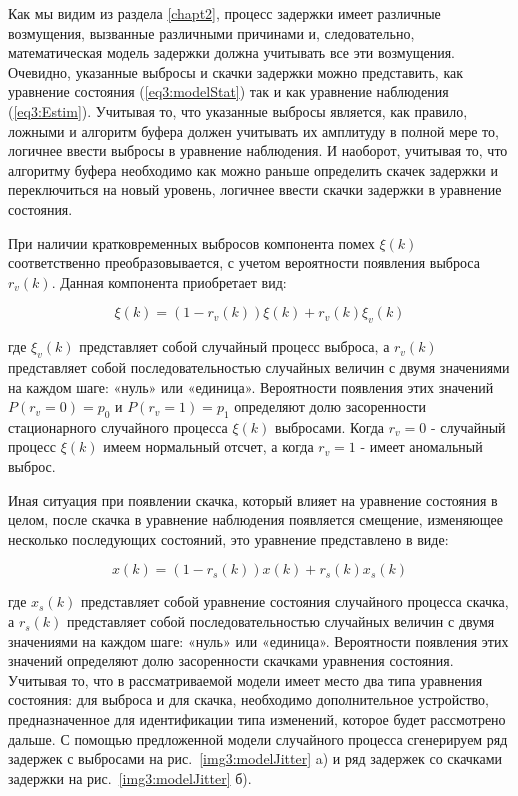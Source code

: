 Как мы видим из раздела \ref{chapt2}, процесс задержки имеет различные возмущения, вызванные различными причинами и, следовательно, математическая модель задержки должна учитывать все эти возмущения.
Очевидно, указанные выбросы и скачки задержки можно представить, как уравнение состояния (\ref{eq3:modelStat}) так и как уравнение наблюдения (\ref{eq3:Estim}). Учитывая то, что указанные выбросы является, как правило, ложными и алгоритм буфера должен учитывать их амплитуду в полной мере то, логичнее ввести выбросы в уравнение наблюдения. И наоборот, учитывая то, что алгоритму буфера необходимо как можно раньше определить скачек задержки и переключиться на новый уровень, логичнее ввести скачки задержки в уравнение состояния.

При наличии кратковременных выбросов компонента помех $\xi(k)$ соответственно преобразовывается, с учетом вероятности появления выброса $r_v(k)$. Данная компонента приобретает вид:

\begin{equation}\label{eq3:v}
\xi(k)=(1-r_v(k))\xi(k)+r_v(k)\xi_v(k)
\end{equation}

\noindent где $\xi_v(k)$ представляет собой случайный процесс выброса, а $r_v(k)$ представляет собой последовательностью случайных величин с двумя значениями на каждом шаге: «нуль» или «единица». Вероятности появления этих значений $P(r_v=0)=p_0$ и $P(r_v=1)=p_1$ определяют долю засоренности стационарного случайного процесса $\xi(k)$ выбросами. Когда $r_v=0$ - случайный процесс  $\xi(k)$ имеем нормальный отсчет, а когда $r_v=1$ - имеет аномальный выброс.

Иная ситуация при появлении скачка, который влияет на уравнение состояния в целом, после скачка в уравнение наблюдения появляется смещение, изменяющее несколько последующих состояний, это уравнение представлено в виде:

\begin{equation}\label{eq3:s}
x(k)=(1-r_s(k))x(k)+r_s(k)x_s(k)
\end{equation}

\noindent где $x_s(k)$ представляет собой уравнение состояния случайного процесса скачка, а $r_s(k)$ представляет собой последовательностью случайных величин с двумя значениями на каждом шаге: «нуль» или «единица». Вероятности появления этих значений определяют долю засоренности скачками уравнения состояния. 
Учитывая то, что в рассматриваемой модели имеет место два типа уравнения состояния: для выброса и для скачка, необходимо дополнительное устройство, предназначенное для идентификации типа изменений, которое будет рассмотрено дальше.
С помощью предложенной модели случайного процесса сгенерируем ряд задержек с выбросами на рис. \ref{img3:modelJitter} a) и ряд задержек со скачками задержки на рис. \ref{img3:modelJitter} б).

